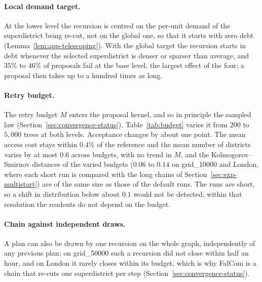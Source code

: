\documentclass[11pt]{article}
\theoremstyle{definition}
\begin{document}
\paragraph{Local demand target.}
At the lower level the recursion is centred on the per-unit demand of the superdistrict being re-cut, not on the global one, so that it starts with zero debt (Lemma~\ref{lem:app-telescoping}). With the global target the recursion starts in debt whenever the selected superdistrict is denser or sparser than average, and $35\%$ to $46\%$ of proposals fail at the base level, the largest effect of the four; a proposal then takes up to a hundred times as long.

\paragraph{Retry budget.}
The retry budget $M$ enters the proposal kernel, and so in principle the sampled law (Section~\ref{sec:convergence-status}). Table~\ref{tab:budget} varies it from $200$ to $5{,}000$ trees at both levels. Acceptance changes by about one point. The mean access cost stays within $0.4\%$ of the reference and the mean number of districts varies by at most $0.6$ across budgets, with no trend in $M$, and the Kolmogorov--Smirnov distances of the varied budgets ($0.06$ to $0.14$ on grid\_10000 and London, where each short run is compared with the long chains of Section~\ref{sec:exp-multistart}) are of the same size as those of the default runs. The runs are short, so a shift in distribution below about $0.1$ would not be detected; within that resolution the readouts do not depend on the budget.

\begin{table}[!htbp]
\centering
\small

\caption{Sensitivity to the retry budget $M$, two seeds per setting. Acceptance is the range over the seeds. For grid\_10000 and London the Kolmogorov--Smirnov distances are from each run to the long chains of Table~\ref{tab:multistart} (largest over the two seeds), and the mean access cost is relative to those chains; for grid\_1000 they are to the pooled default runs. Values in parentheses are the default setting, which gives the noise of the comparison.}
\label{tab:budget}
\end{table}

\paragraph{Chain against independent draws.}
A plan can also be drawn by one recursion on the whole graph, independently of any previous plan; on grid\_50000 such a recursion did not close within half an hour, and on London it rarely closes within its budget, which is why FalCom is a chain that re-cuts one superdistrict per step (Section~\ref{sec:convergence-status}).
\end{document}
